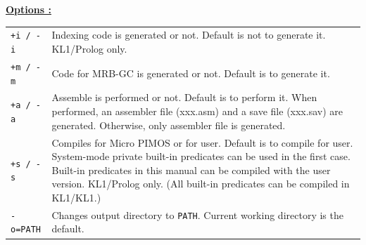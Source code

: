 \noindent\underline{\bf Options :}\vspace{2ex}\par
\begin{center}
\begin{tabular}{l@{ :: }p{120mm}}
\verb|+i / -i| &
Indexing code is generated or not. Default is not to generate it. KL1/Prolog only.\\
\verb|+m / -m| &
Code for MRB-GC is generated or not. Default is to generate it.\\
\verb|+a / -a| &
Assemble is performed or not. Default is to perform it. When performed, an assembler file (xxx.asm) and
a save file (xxx.sav) are generated. Otherwise, only assembler file is
generated.\\
\verb|+s / -s| &
Compiles for Micro PIMOS or for user. Default is to compile for user.
System-mode private built-in predicates can be used in the first case. Built-in
predicates in this manual can be compiled with the user version. KL1/Prolog only. (All built-in predicates can be compiled in KL1/KL1.)\\
\verb|-o=PATH| &
Changes output directory to \verb|PATH|. Current working  directory
 is the default.
\end{tabular}
\end{center}
\vspace{3ex}

